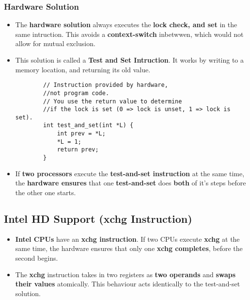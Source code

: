 \documentclass{article}
\begin{document}
\subsubsection*{Hardware Solution}
\begin{itemize}
    \item The \textbf{hardware solution} always executes the \textbf{lock check, and set} in the same intruction. This avoids a \textbf{context-switch} inbetwwen, which would not allow for mutual exclusion.
    \item This solution is called a \textbf{Test and Set Intruction}. It works by writing to a memory location, and returning its old value.
    \begin{verbatim}
        // Instruction provided by hardware, 
        //not program code.
        // You use the return value to determine 
        //if the lock is set (0 => lock is unset, 1 => lock is set).
        int test_and_set(int *L) {
            int prev = *L;
            *L = 1;
            return prev;
        }    
    \end{verbatim}
    \item If \textbf{two processors} execute the \textbf{test-and-set instruction} at the same time, the \textbf{hardware ensures} that one \textbf{test-and-set} does \textbf{both} of it's steps before the other one starts.
\end{itemize}

\subsection*{Intel HD Support (xchg Instruction)}
\begin{itemize}
    \item \textbf{Intel CPUs} have an \textbf{xchg instruction}. If two CPUs execute \textbf{xchg} at the same time, the hardware ensures that only one \textbf{xchg completes}, before the second begins.
    \item The \textbf{xchg} instruction takes in two registers as \textbf{two operands} and \textbf{swaps their values} atomically. This behaviour acts identically to the test-and-set solution.
\end{itemize}
\end{document}

